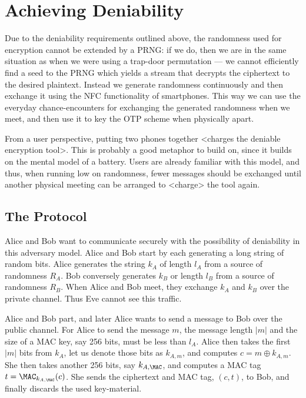 \section{Achieving Deniability}
\label{sec:otp-kx}

Due to the deniability requirements outlined above, the randomness used for 
encryption cannot be extended by a \ac{PRNG}: if we do, then we are in the same 
situation as when we were using a trap-door permutation --- we cannot 
efficiently find a seed to the \ac{PRNG} which yields a stream that decrypts 
the ciphertext to the desired plaintext.
Instead we generate randomness continuously and then exchange it using the 
\ac{NFC} functionality of smartphones.
This way we can use the everyday chance-encounters for exchanging the generated 
randomness when we meet, and then use it to key the \ac{OTP} scheme when 
physically apart.

From a user perspective, putting two phones together <charges the deniable 
encryption tool>.
This is probably a good metaphor to build on, since it builds on the mental 
model of a battery.
Users are already familiar with this model, and thus, when running low on 
randomness, fewer messages should be exchanged until another physical meeting 
can be arranged to <charge> the tool again.

\subsection{The Protocol}
\label{sec:Protocol}

Alice and Bob want to communicate securely with the possibility of deniability 
in this adversary model.
Alice and Bob start by each generating a long string of random bits.
Alice generates the string \(k_A\) of length \(l_A\) from a source of 
randomness \(R_A\).
Bob conversely generates \(k_B\) or length \(l_B\) from a source of randomness 
\(R_B\).
When Alice and Bob meet, they exchange \(k_A\) and \(k_B\) over the private 
channel.
Thus Eve cannot see this traffic.

Alice and Bob part, and later Alice wants to send a message to Bob over the 
public channel.
For Alice to send the message \(m\), the message length \(|m|\) and the size of 
a \ac{MAC} key, say 256 bits, must be less than \(l_A\).
Alice then takes the first \(|m|\) bits from \(k_A\), let us denote those bits 
as \(k_{A,m}\), and computes \(c = m\oplus k_{A,m}\).
She then takes another 256 bits, say \(k_{A,\MAC}\), and computes a \ac{MAC} 
tag \(t = \MAC_{k_{A,\MAC}}( c )\).
She sends the ciphertext and \ac{MAC} tag, \((c, t)\), to Bob, and finally 
discards the used key-material.

